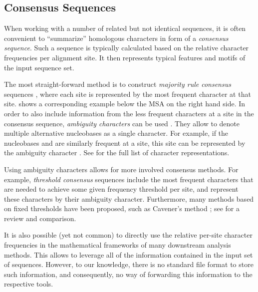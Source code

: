 
\subsection{Consensus Sequences}
\label{ch:Foundations:sec:SequenceAnalysis:sub:ConsensusSequences}

When working with a number of related but not identical sequences,
it is often convenient to ``summarize'' homologous characters in form of a \emph{consensus sequence}.
Such a sequence is typically calculated based on the relative character frequencies per alignment site.
It then represents typical features and motifs of the input sequence set.

The most straight-forward method is to construct \emph{majority rule consensus} sequences \citep{May1952,Day1992a},
where each site is represented by the most frequent character at that site.
 shows a corresponding example below the MSA on the right hand side.
In order to also include information from the less frequent characters at a site in the consensus sequence,
\emph{ambiguity characters} can be used \cite{IUPAC1970}.
They allow to denote multiple alternative nucleobases as a single character.
For example, if the nucleobases  and  are similarly frequent at a site,
this site can be represented by the ambiguity character .
See  for the full list of character representations.

Using ambiguity characters allows for more involved consensus methods.
For example, \emph{threshold consensus} sequences \citep{Day1992a,Day1992} include the most frequent characters
that are needed to achieve some given frequency threshold per site,
and represent these characters by their ambiguity character.
Furthermore, many methods based on fixed thresholds have been proposed,
such as Cavener's method \citep{Cavener1987,Cavener1991a};
see  for a review and comparison.

It is also possible (yet not common) to directly use the relative per-site character frequencies
in the mathematical frameworks of many downstream analysis methods.
This allows to leverage all of the information contained in the input set of sequences.
However, to our knowledge, there is no standard file format to store such information,
and consequently, no way of forwarding this information to the respective tools.

